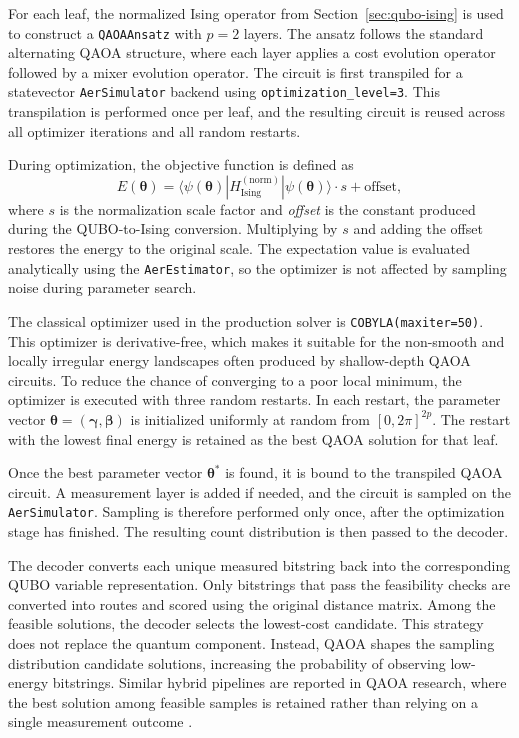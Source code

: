 \documentclass[a4paper]{report}
\begin{document}
{\begin{itemize}
\begin{itemize}
For each leaf, the normalized Ising operator from
Section~\ref{sec:qubo-ising} is used to construct a
\texttt{QAOAAnsatz} with $p=2$ layers. The ansatz follows the standard
alternating QAOA structure, where each layer applies a cost evolution
operator followed by a mixer evolution operator. The circuit is first
transpiled for a statevector \texttt{AerSimulator} backend using
\texttt{optimization\_level=3}. This transpilation is performed once per
leaf, and the resulting circuit is reused across all optimizer
iterations and all random restarts. 

During optimization, the objective function is defined as
\begin{equation}
E(\boldsymbol{\theta})
=
\langle\psi(\boldsymbol{\theta})|
H_{\text{Ising}}^{(\text{norm})}
|\psi(\boldsymbol{\theta})\rangle
\cdot s
+
\text{offset},
\label{eq:energy-recovery}
\end{equation}
where $s$ is the normalization scale factor and \emph{offset} is the
constant produced during the QUBO-to-Ising conversion. Multiplying by
$s$ and adding the offset restores the energy to the original 
scale. The expectation value is evaluated analytically using the
\texttt{AerEstimator}, so the optimizer is not affected by sampling
noise during parameter search.

The classical optimizer used in the production solver is
\texttt{COBYLA(maxiter=50)}. This optimizer is derivative-free, which
makes it suitable for the non-smooth and locally irregular energy
landscapes often produced by shallow-depth QAOA circuits. To reduce the
chance of converging to a poor local minimum, the optimizer is executed
with three random restarts. In each restart, the parameter vector
$\boldsymbol{\theta}=(\boldsymbol{\gamma},\boldsymbol{\beta})$ is
initialized uniformly at random from $[0,2\pi]^{2p}$. The restart with
the lowest final energy is retained as the best QAOA solution for that
leaf.

Once the best parameter vector $\boldsymbol{\theta}^{*}$ is found, it is
bound to the transpiled QAOA circuit. A measurement layer is added if
needed, and the circuit is sampled on the \texttt{AerSimulator}. Sampling is therefore performed only once, after the optimization stage has finished. The resulting count distribution is then passed to the decoder.

The decoder converts each unique measured bitstring back into the
corresponding QUBO variable representation. Only bitstrings that pass the feasibility checks are converted into routes and scored using the original distance matrix. Among the feasible
solutions, the decoder selects the lowest-cost candidate.
This strategy does not replace the quantum component. Instead, QAOA shapes the sampling distribution candidate solutions, increasing the probability of observing low-energy bitstrings. Similar hybrid pipelines are reported in QAOA research, where the best solution among feasible samples is retained rather than relying on a single measurement outcome \cite{cirq_qaoa_maxcut}.




\end{itemize}
\end{itemize}}
\end{document}
